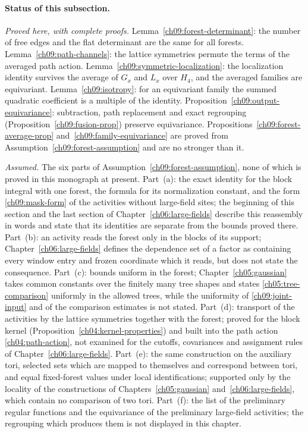 \paragraph{Status of this subsection.}
\emph{Proved here, with complete proofs.}
Lemma~\ref{ch09:forest-determinant}: the number of free edges and the
flat determinant are the same for all forests.
Lemma~\ref{ch09:path-channels}: the lattice symmetries permute the
terms of the averaged path action.
Lemma~\ref{ch09:symmetric-localization}: the localization identity
survives the average of $G_x$ and $L_x$ over $H_4$, and the averaged
families are equivariant.
Lemma~\ref{ch09:isotropy}: for an equivariant family the summed
quadratic coefficient is a multiple of the identity.
Proposition~\ref{ch09:output-equivariance}: subtraction, path
replacement and exact regrouping (Proposition~\ref{ch09:fusion-prop}) preserve equivariance.
Propositions~\ref{ch09:forest-average-prop}
and~\ref{ch09:family-equivariance} are proved from
Assumption~\ref{ch09:forest-assumption} and are no stronger than it.

\emph{Assumed.} The six parts of
Assumption~\ref{ch09:forest-assumption}, none of which is proved in
this monograph at present.
Part~(a): the exact identity for the block integral with one forest,
the formula for its normalization constant, and the form
\eqref{ch09:mask-form} of the activities without large-field sites;
the beginning of this section and the last section of
Chapter~\ref{ch06:large-fields} describe this reassembly in words and
state that its identities are separate from the bounds proved there.
Part~(b): an activity reads the forest only in the blocks of its
support; Chapter~\ref{ch06:large-fields} defines the dependence set
of a factor as containing every window entry and frozen coordinate
which it reads, but does not state the consequence.
Part~(c): bounds uniform in the forest; Chapter~\ref{ch05:gaussian}
takes common constants over the finitely many tree shapes and states
\eqref{ch05:tree-comparison} uniformly in the allowed trees, while the
uniformity of \eqref{ch09:joint-input} and of the comparison estimates
is not stated.
Part~(d): transport of the activities by the lattice symmetries
together with the forest; proved for the block kernel
(Proposition~\ref{ch04:kernel-properties}) and built into the path
action \eqref{ch04:path-action}, not examined for the cutoffs,
covariances and assignment rules of Chapter~\ref{ch06:large-fields}.
Part~(e): the same construction on the auxiliary tori, selected sets
which are mapped to themselves and correspond between tori, and equal
fixed-forest values under local identifications; supported only by the
locality of the constructions of Chapters~\ref{ch05:gaussian}
and~\ref{ch06:large-fields}, which contain no comparison of two tori.
Part~(f): the list of the preliminary regular functions and the
equivariance of the preliminary large-field activities;
the regrouping which produces them is not displayed in this chapter.

